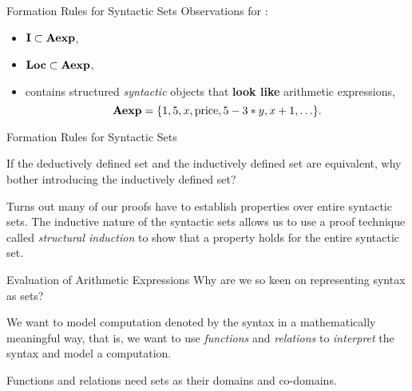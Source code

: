 \documentclass{beamer}
\begin{document}

\begin{frame}{Formation Rules for Syntactic Sets}
Observations for :
\begin{itemize}
\item $\mbox{\bf I} \subset \mbox{\bf Aexp}$,
\item $\mbox{\bf Loc} \subset \mbox{\bf Aexp}$,
\item contains structured {\em syntactic} objects that {\bf look like} arithmetic expressions,
\[
\mbox{\bf Aexp} = \{1,5,x,\mbox{price},5-3*y,x+1,\ldots\}.
\]
\end{itemize}
\end{frame}


\begin{frame}{Formation Rules for Syntactic Sets}

If the deductively defined set and the inductively defined set are equivalent, why bother introducing the inductively defined set?

\vspace{.2in}

Turns out many of our proofs have to establish properties over entire syntactic sets.  The inductive nature of the syntactic sets allows us to use a
proof technique called {\em structural induction} to show that a property holds for the entire syntactic set.

\end{frame}


\begin{frame}{\large Evaluation of Arithmetic Expressions}
Why are we so keen on representing syntax as sets?

\vspace{.1in}

We want to model computation denoted by the syntax in a mathematically meaningful
way, that is, we want to use {\em functions} and {\em relations} to {\em interpret} the syntax and model a computation.

\vspace{.1in}

Functions and relations need sets as their domains and co-domains.

\end{frame}
\end{document}
